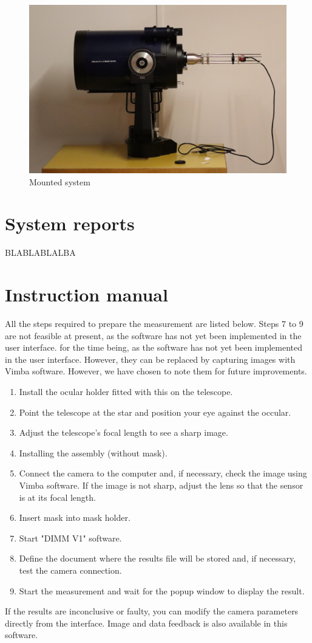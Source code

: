 \begin{figure}[H]
    \centering
    \includegraphics[scale=0.1]{assets/figures/System/IMG_5308.JPG}
    \caption{Mounted system}
    \label{fig:GLOB_Syst}
\end{figure}
\newpage
\section{System reports}
BLABLABLALBA
\section{Instruction manual}
All the steps required to prepare the measurement are listed below. Steps 7 to 9 are not feasible at present, 
as the software has not yet been implemented in the user interface.
for the time being, as the software has not yet been implemented in the user interface. However, they can be replaced by capturing images with Vimba software. However, we have chosen to note them for future improvements.
\begin{enumerate}
    \item Install the ocular holder fitted with this on the telescope.
    \item Point the telescope at the star and position your eye against the occular.
    \item Adjust the telescope's focal length to see a sharp image.
    \item Installing the assembly (without mask).
    \item Connect the camera to the computer and, if necessary, check the image using Vimba software. 
    If the image is not sharp, adjust the lens so that the sensor is at its focal length.
    \item Insert mask into mask holder.
    \item Start "DIMM V1" software.
    \item Define the document where the results file will be stored and, if necessary, test the camera connection.
    \item Start the measurement and wait for the popup window to display the result.
\end{enumerate}
If the results are inconclusive or faulty, you can modify the camera parameters directly from the interface.
Image and data feedback is also available in this software.